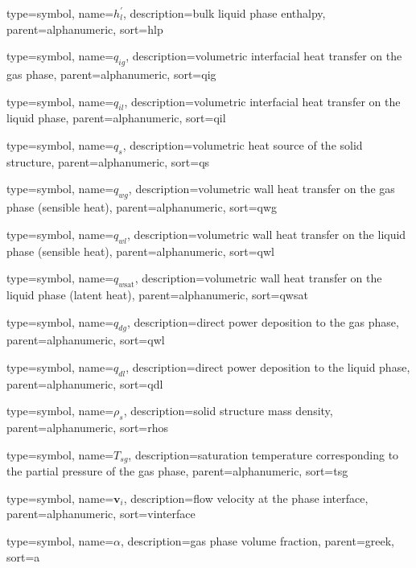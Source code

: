 {
  type=symbol,
	name={\ensuremath{h^\prime_l}},
	description={bulk liquid phase enthalpy},
	parent=alphanumeric,
	sort={hlp}
}

{
  type=symbol,
	name={\ensuremath{q_{ig}}},
	description={volumetric interfacial heat transfer on the gas phase},
	parent=alphanumeric,
	sort={qig}
}

{
  type=symbol,
	name={\ensuremath{q_{il}}},
	description={volumetric interfacial heat transfer on the liquid phase},
	parent=alphanumeric,
	sort={qil}
}

{
  type=symbol,
	name={\ensuremath{q_s}},
	description={volumetric heat source of the solid structure},
	parent=alphanumeric,
	sort={qs}
}

{
  type=symbol,
	name={\ensuremath{q_{wg}}},
	description={volumetric wall heat transfer on the gas phase (sensible heat)},
	parent=alphanumeric,
	sort={qwg}
}

{
  type=symbol,
	name={\ensuremath{q_{wl}}},
	description={volumetric wall heat transfer on the liquid phase (sensible heat)},
	parent=alphanumeric,
	sort={qwl}
}

{
  type=symbol,
	name={\ensuremath{q_{w\text{sat}}}},
	description={volumetric wall heat transfer on the liquid phase (latent heat)},
	parent=alphanumeric,
	sort={qwsat}
}

{
  type=symbol,
	name={\ensuremath{q_{dg}}},
	description={direct power deposition to the gas phase},
	parent=alphanumeric,
	sort={qwl}
}


{
  type=symbol,
	name={\ensuremath{q_{dl}}},
	description={direct power deposition to the liquid phase},
	parent=alphanumeric,
	sort={qdl}
}

{
  type=symbol,
	name={\ensuremath{\rho_{s}}},
	description={solid structure mass density},
	parent=alphanumeric,
	sort={rhos}
}

{
  type=symbol,
	name={\ensuremath{T_{sg}}},
	description={saturation temperature corresponding to the partial pressure of the gas phase},
	parent=alphanumeric,
	sort={tsg}
}

{
  type=symbol,
	name={\ensuremath{\mathbf{v}_i}},
	description={flow velocity at the phase interface},
	parent=alphanumeric,
	sort={vinterface}
}	

{
  type=symbol,
	name={\ensuremath{\alpha}},
	description={gas phase volume fraction},
	parent=greek,
	sort={a}
}	

